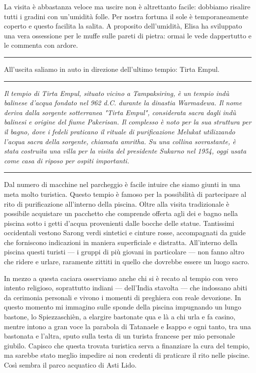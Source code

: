 La visita è abbastanza veloce ma uscire non è altrettanto facile: dobbiamo risalire tutti i gradini con un'umidità folle. Per nostra fortuna il sole è temporaneamente coperto e questo facilita la salita. A proposito dell'umidità, Elisa ha sviluppato una vera ossessione per le muffe sulle pareti di pietra: ormai le vede dappertutto e le commenta con ardore.

\begin{center}
    \noindent\rule{0.6\textwidth}{0.4pt}
\end{center}

All'uscita saliamo in auto in direzione dell'ultimo tempio: Tirta Empul.

\begin{center}
    \noindent\rule{0.6\textwidth}{0.4pt}
\end{center}

\textit{Il tempio di Tirta Empul, situato vicino a Tampaksiring, è un tempio indù balinese d'acqua fondato nel 962 d.C. durante la dinastia Warmadewa. Il nome deriva dalla sorgente sotterranea "Tirta Empul", considerata sacra dagli indù balinesi e origine del fiume Pakerisan. Il complesso è noto per la sua struttura per il bagno, dove i fedeli praticano il rituale di purificazione Melukat utilizzando l'acqua sacra della sorgente, chiamata amritha. Su una collina sovrastante, è stata costruita una villa per la visita del presidente Sukarno nel 1954, oggi usata come casa di riposo per ospiti importanti.}

\begin{center}
    \noindent\rule{0.6\textwidth}{0.4pt}
\end{center}

Dal numero di macchine nel parcheggio è facile intuire che siamo giunti in una meta molto turistica. Questo tempio è famoso per la possibilità di partecipare al rito di purificazione all'interno della piscina. Oltre alla visita tradizionale è possibile acquistare un pacchetto che comprende offerta agli dei e bagno nella piscina sotto i getti d'acqua provenienti dalle bocche delle statue. Tantissimi occidentali vestono Sarong verdi sintetici e cinture rosse, accompagnati da guide che forniscono indicazioni in maniera superficiale e distratta. All'interno della piscina questi turisti — i gruppi di più giovani in particolare — non fanno altro che ridere e urlare, raramente zittiti in quello che dovrebbe essere un luogo sacro.

In mezzo a questa caciara osserviamo anche chi si è recato al tempio con vero intento religioso, soprattutto indiani — dell'India stavolta — che indossano abiti da cerimonia personali e vivono i momenti di preghiera con reale devozione. In questo momento mi immagino sulle sponde della piscina impugnando un lungo bastone, lo Spiezzaschièn, a elargire bastonate qua e là a chi urla e fa casino, mentre intono a gran voce la parabola di Tatanaele e Isappo e ogni tanto, tra una bastonata e l'altra, sputo sulla testa di un turista francese per mio personale giubilo. Capisco che questa trovata turistica serva a finanziare la cura del tempio, ma sarebbe stato meglio impedire ai non credenti di praticare il rito nelle piscine. Così sembra il parco acquatico di Asti Lido.

